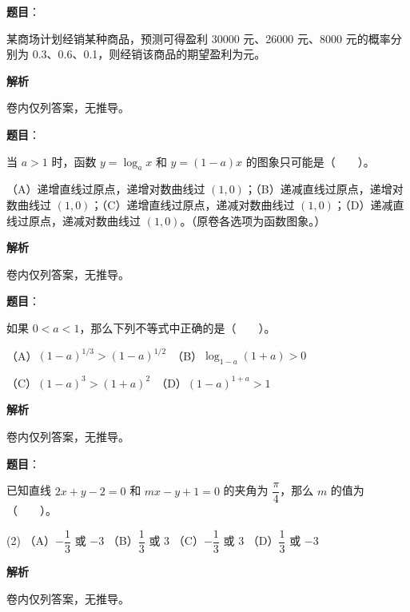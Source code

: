 \begin{answer}

\textbf{题目}：

某商场计划经销某种商品，预测可得盈利 30000 元、26000 元、8000 元的概率分别为 0.3、0.6、0.1，则经销该商品的期望盈利为\gkblank{}元。

\textbf{解析}

卷内仅列答案，无推导。


\end{answer}
\begin{answer}

\textbf{题目}：

当 $a>1$ 时，函数 $y=\log_a x$ 和 $y=(1-a)x$ 的图象只可能是\mbox{（　　）}。

（A）递增直线过原点，递增对数曲线过 $(1,0)$；（B）递减直线过原点，递增对数曲线过 $(1,0)$；（C）递增直线过原点，递减对数曲线过 $(1,0)$；（D）递减直线过原点，递减对数曲线过 $(1,0)$。（原卷各选项为函数图象。）
\nopagebreak[4]
\begin{center}\end{center}
\nopagebreak[4]
\textbf{解析}

卷内仅列答案，无推导。


\end{answer}
\begin{answer}

\textbf{题目}：

如果 $0<a<1$，那么下列不等式中正确的是\mbox{（　　）}。

（A）$(1-a)^{1/3}>(1-a)^{1/2}$　（B）$\log_{1-a}(1+a)>0$

（C）$(1-a)^3>(1+a)^2$　（D）$(1-a)^{1+a}>1$

\textbf{解析}

卷内仅列答案，无推导。


\end{answer}
\begin{answer}

\textbf{题目}：

已知直线 $2x+y-2=0$ 和 $mx-y+1=0$ 的夹角为 $\dfrac\pi4$，那么 $m$ 的值为\mbox{（　　）}。

\begin{gkopts}(2)
\task （A）$-\dfrac13$ 或 $-3$
\task （B）$\dfrac13$ 或 $3$
\task （C）$-\dfrac13$ 或 $3$
\task （D）$\dfrac13$ 或 $-3$
\end{gkopts}

\textbf{解析}

卷内仅列答案，无推导。


\end{answer}
